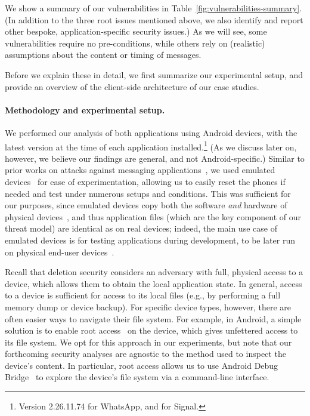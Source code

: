 We show a summary of our vulnerabilities in Table~\ref{fig:vulnerabilities-summary}. (In addition to the three root issues mentioned above, we also identify and report other bespoke, application-specific security issues.) As we will see, some vulnerabilities require no pre-conditions, while others rely on (realistic) assumptions about the content or timing of messages.

Before we explain these in detail, we first summarize our experimental setup, and provide an overview of the client-side architecture of our case studies.

\paragraph{Methodology and experimental setup.} We performed our analysis of both applications using Android devices, with the latest version at the time of each application installed.\footnote{Version 2.26.11.74 for WhatsApp, and  for Signal.} (As we discuss later on, however, we believe our findings are general, and not Android-specific.) Similar to prior works on attacks against messaging applications~\cite{fabrega2024injection}, we used emulated devices~\cite{android-emulator-1} for ease of experimentation, allowing us to easily reset the phones if needed and test under numerous setups and conditions. This was sufficient for our purposes, since emulated devices copy both the software \emph{and} hardware of physical devices~\cite{android-emulator-2}, and thus application files (which are the key component of our threat model) are identical as on real devices; indeed, the main use case of emulated devices is for testing applications during development, to be later run on physical end-user devices~\cite{android-emulator-1}.

Recall that deletion security considers an adversary with full, physical access to a device, which allows them to obtain the local application state. In general, access to a device is sufficient for access to its local files (e.g., by performing a full memory dump or device backup). For specific device types, however, there are often easier ways to navigate their file system. For example, in Android, a simple solution is to enable root access~\cite{sun2015android} on the device, which gives unfettered access to its file system. We opt for this approach in our experiments, but note that our forthcoming security analyses are agnostic to the method used to inspect the device's content. In particular, root access allows us to use Android Debug Bridge~\cite{adb} to explore the device's file system via a command-line interface.

